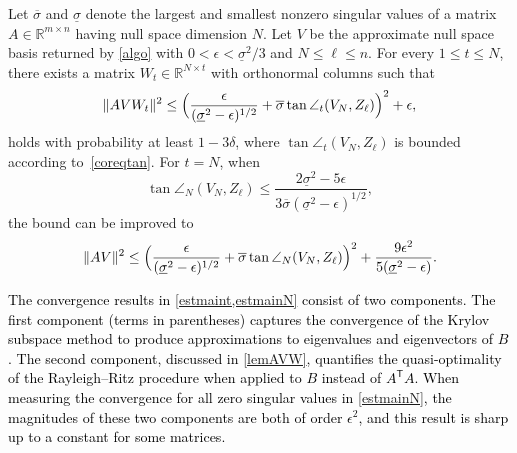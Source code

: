 \documentclass{siamart190516}
\newcommand{\Ttran}{\mathsf{T}}
\newcommand{\R}{\mathbb{R}}
\providecommand{\norm}[1]{\lVert#1\rVert}
\newcommand{\edit}[1]{\textcolor{black}{#1}} %
\newcommand{\editr}[1]{\textcolor{black}{#1}} %
\begin{document}
\begin{theorem}
    \label{thmmain}
    Let $\overline{\sigma}$ and $\underline{\sigma}$ denote the largest and smallest nonzero singular values of a matrix $A\in\R^{m \times n}$ having null space dimension $N$. Let $V$ be the approximate null space basis returned by \cref{algo} with $0<\epsilon<\underline{\sigma}^{2}/3$ and $N\leq \ell\leq n$. For every $1\leq t\leq N$, there exists a matrix $W_{t}\in\R^{N\times t}$ with orthonormal columns such that 
    \begin{equation}
        \label{estmaint}
        \norm{AVW_{t}}^{2}\leq \Bigl(\frac{\epsilon}{(\underline{\sigma}^{2}-\epsilon)^{1/2}}+\overline{\sigma}\tan\angle_{t}(V_{N},Z_{\ell})\Bigr)^{2}+\epsilon,
    \end{equation}
    holds with probability at least $1-3\delta$,
    where $\tan\angle_{t}(V_{N},Z_{\ell})$ is bounded according to~\cref{coreqtan}. For $t=N$, when
    \begin{equation}
        \label{contan}
        \tan\angle_{N}(V_{N},Z_{\ell})\leq \frac{2\underline{\sigma}^{2}-5\epsilon}{3\overline{\sigma}(\underline{\sigma}^{2}-\epsilon)^{1/2}},
    \end{equation}
    the bound can be improved to 
    \begin{equation}
        \label{estmainN}
        \norm{AV}^{2}\leq \Bigl(\frac{\epsilon}{(\underline{\sigma}^{2}-\epsilon)^{1/2}}+\overline{\sigma}\tan\angle_{N}(V_{N},Z_{\ell})\Bigr)^{2}+\frac{9\epsilon^{2}}{5(\underline{\sigma}^{2}-\epsilon)}.
    \end{equation}
\end{theorem}

\edit{The convergence results in \cref{estmaint,estmainN} consist of two components. The first component (terms in parentheses) captures the convergence of the Krylov subspace method to produce approximations to eigenvalues and eigenvectors of $B$. 
The second component, discussed in \cref{lemAVW}, quantifies the quasi-optimality of the Rayleigh--Ritz procedure when applied to $B$ instead of $A^{\Ttran}A$. 
When measuring the convergence for all zero singular values in \cref{estmainN}, the magnitudes of these two components are both of order $\epsilon^{2}$,} \editr{and this result is sharp up to a constant for some matrices.}
\end{document}

